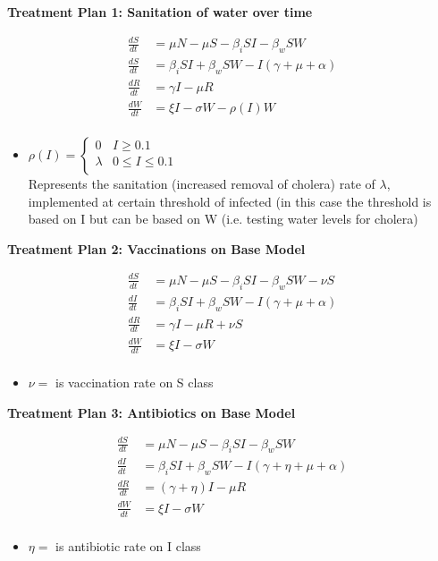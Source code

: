 \documentclass[]{article}
\begin{document}
\textbf{Treatment Plan 1: Sanitation of water over time}

\begin{align*}
	\frac{dS}{dt}&= \mu N - \mu S - \beta_i SI - \beta_w S W  \\
	\frac{dS}{dt}&= \beta_i S I + \beta_w S W - I (\gamma + \mu + \alpha) \\
	\frac{dR}{dt}&= \gamma I - \mu R \\
	\frac{dW}{dt}&= \xi I  - \sigma W - \rho (I) W\\
\end{align*}
	
\begin{itemize}
	\item $\rho (I)= \begin{cases}
			 			0 & I \geq 0.1 \\
			 			\lambda & 0 \leq I \leq 0.1 \\
			 			\end{cases}$\\
	Represents the sanitation (increased removal of cholera) rate of $\lambda$, implemented at certain threshold of infected (in this case the threshold is based on I but can be based on W (i.e. testing water levels for cholera) %
\end{itemize} 	 
		

\textbf{Treatment Plan 2: Vaccinations on Base Model}

\begin{align*}
	\frac{dS}{dt}&= \mu N - \mu S - \beta_i SI - \beta_w S W - \nu S \\
	\frac{dI}{dt}&= \beta_i S I + \beta_w S W - I (\gamma + \mu + \alpha) \\
	\frac{dR}{dt}&= \gamma I - \mu R + \nu S\\
	\frac{dW}{dt}&= \xi I  - \sigma W\\
\end{align*}

\begin{itemize}
	\item $\nu=$ is vaccination rate on S class
\end{itemize} 

\textbf{Treatment Plan 3: Antibiotics on Base Model}

\begin{align*}
	\frac{dS}{dt}&= \mu N - \mu S - \beta_i SI - \beta_w S W \\
	\frac{dI}{dt}&= \beta_i S I + \beta_w S W - I (\gamma +\eta + \mu + \alpha ) \\
	\frac{dR}{dt}&= (\gamma +\eta)I - \mu R \\
	\frac{dW}{dt}&= \xi I  - \sigma W\\
\end{align*}
\begin{itemize}
	\item $\eta=$ is antibiotic rate on I class
\end{itemize} 
\end{document}
